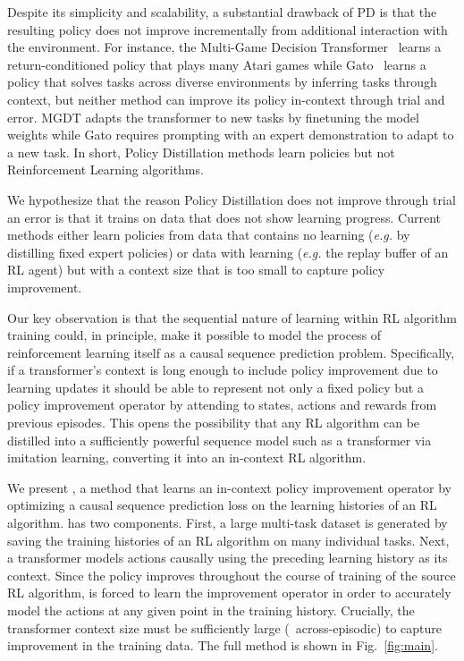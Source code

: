 Despite its simplicity and scalability, a substantial drawback of PD is that the resulting policy does not improve incrementally from additional interaction with the environment. For instance, the Multi-Game Decision Transformer~\citep[MGDT,][]{lee2022mgdt} learns a return-conditioned policy that plays many Atari games while Gato~\citep{reed2022gato} learns a policy that  solves tasks across diverse environments by inferring tasks through context, but neither method can improve its policy in-context through trial and error. MGDT adapts the transformer to new tasks by finetuning the model weights while Gato requires prompting with an expert demonstration to adapt to a new task. In short, Policy Distillation methods learn policies but not Reinforcement Learning algorithms.

We hypothesize that the reason Policy Distillation does not improve through trial an error is that it trains on data that does not show learning progress. Current methods either learn policies from data that contains no learning ({\it e.g.} by distilling fixed expert policies) or data with learning ({\it e.g.} the replay buffer of an RL agent) but with a context size that is too small to capture policy improvement.

Our key observation is that the sequential nature of learning within RL algorithm training could, in principle, make it possible to model the process of reinforcement learning itself as a causal sequence prediction problem.
Specifically, if a transformer’s context is long enough to include policy improvement due to learning updates it should be able to represent not only a fixed policy but a policy improvement operator by attending to states, actions and rewards from previous episodes.
This opens the possibility that any RL algorithm can be distilled into a sufficiently powerful sequence model such as a transformer via imitation learning, converting it into an in-context RL algorithm.

We present \namedefnospace, a method that learns an in-context policy improvement operator by optimizing a causal sequence prediction loss on the learning histories of an RL algorithm.
\name has two components. First, a large multi-task dataset is generated by saving the training histories of an RL algorithm on many individual tasks. Next, a transformer models actions causally using the preceding learning history as its context. Since the policy improves throughout the course of training of the source RL algorithm, \name is forced to learn the improvement operator in order to accurately model the actions at any given point in the training history. Crucially, the transformer context size must be sufficiently large (\ie \, across-episodic) to capture improvement in the training data. The full method is shown in Fig.~\ref{fig:main}. 

